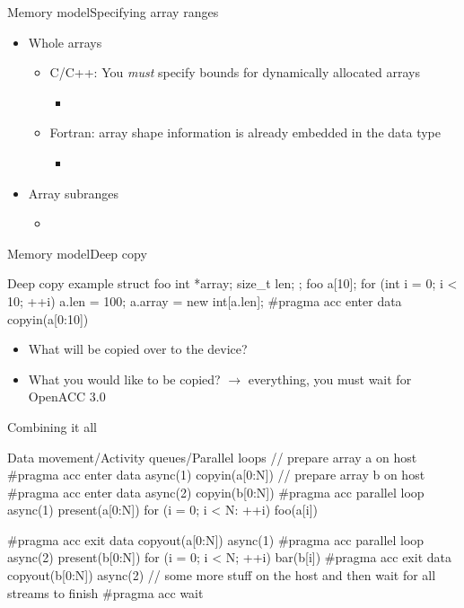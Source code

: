 \documentclass[12pt,aspectratio=169]{beamer}
\begin{document}
\begin{frame}[fragile]{Memory model}{Specifying array ranges}
  \begin{itemize}
  \item Whole arrays
    \begin{itemize}
    \item C/C++: You \emph{must} specify bounds for dynamically allocated arrays
      \begin{itemize}
      \item {}
      \end{itemize}
    \item Fortran: array shape information is already embedded in the data type
      \begin{itemize}
      \item {}
      \end{itemize}
    \end{itemize}
  \item Array subranges
    \begin{itemize}
    \item {}
    \end{itemize}
  \end{itemize}
\end{frame}

\begin{frame}[fragile]{Memory model}{Deep copy}
  \begin{Cpplisting}{Deep copy example}
struct foo {
    int *array;
    size_t len;
};
foo a[10];
for (int i = 0; i < 10; ++i) {
    a.len = 100;
    a.array = new int[a.len];
}
#pragma acc enter data copyin(a[0:10])
  \end{Cpplisting}
  \begin{itemize}
  \item What will be copied over to the device? 
  \item<3-> What you would like to be copied? $\rightarrow$
    everything, you must wait for OpenACC 3.0
  \end{itemize}
\end{frame}

\begin{frame}[fragile]{Combining it all}
  \begin{Cpplisting}{Data movement/Activity queues/Parallel loops}
// prepare array a on host
#pragma acc enter data async(1) copyin(a[0:N])
// prepare array b on host
#pragma acc enter data async(2) copyin(b[0:N])
#pragma acc parallel loop async(1) present(a[0:N])
for (i = 0; i < N: ++i)
    foo(a[i])

#pragma acc exit data copyout(a[0:N]) async(1)
#pragma acc parallel loop async(2) present(b[0:N])
for (i = 0; i < N; ++i)
    bar(b[i])
#pragma acc exit data copyout(b[0:N]) async(2)
// some more stuff on the host and then wait for all streams to finish
#pragma acc wait

  \end{Cpplisting}
\end{frame}
\end{document}
